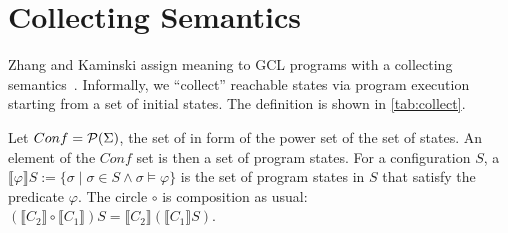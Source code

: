



\newcommand{\sem}[1]{\llbracket #1 \rrbracket}
\newcommand{\power}[1]{\mathcal{P}(#1)}
\newcommand{\semb}[2]{\llbracket #1 \rrbracket \{#2\}}

\section{Collecting Semantics}\label{sec:collecting}
Zhang and Kaminski assign meaning to GCL programs with a collecting semantics~\cite{zhang22-full}. 
Informally, we ``collect'' reachable states via program execution starting from a set of initial states. 
The definition is shown in \autoref{tab:collect}. 

Let $Conf = \power{\S}$, the set of  in form of the power set of the set of states. 
An element of the $Conf$ set is then a set of program states. 
For a configuration $S$, a  $\sem{\varphi}S:=\{\sigma\mid\sigma\in S \wedge \sigma\vDash\varphi\}$ is the set of program states in $S$ that satisfy the predicate $\varphi$. 
The circle $\circ$ is composition as usual: $(\sem{C_2}\circ\sem{C_1})S = \sem{C_2}(\sem{C_1}S)$. 


